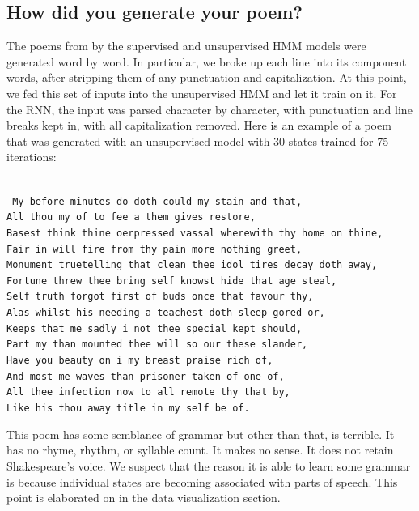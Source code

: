 \subsection{How did you generate your poem?}
The poems from by the supervised and unsupervised HMM models were generated word by word. In particular, we broke up each line into its component words, after stripping them of any punctuation and capitalization. At this point, we fed this set of inputs into the unsupervised HMM and let it train on it. For the RNN, the input was parsed character by character, with punctuation and line breaks kept in, with all capitalization removed. Here is an example of a poem that was generated with an unsupervised model with 30 states trained for 75 iterations: \\ \\
\begin{small}
\texttt{
My before minutes do doth could my stain and that, \\
All thou my of to fee a them gives restore, \\
Basest think thine oerpressed vassal wherewith thy home on thine, \\
Fair in will fire from thy pain more nothing greet, \\
Monument truetelling that clean thee idol tires decay doth away, \\
Fortune threw thee bring self knowst hide that age steal, \\
Self truth forgot first of buds once that favour thy, \\
Alas whilst his needing a teachest doth sleep gored or, \\
Keeps that me sadly i not thee special kept should, \\
Part my than mounted thee will so our these slander, \\
Have you beauty on i my breast praise rich of, \\
And most me waves than prisoner taken of one of, \\
All thee infection now to all remote thy that by, \\
Like his thou away title in my self be of. \\
}
\end{small}
This poem has some semblance of grammar but other than that, is terrible. It has no rhyme, rhythm, or syllable count. It makes no sense. It does not retain Shakespeare's voice. We suspect that the reason it is able to learn some grammar is because individual states are becoming associated with parts of speech. This point is elaborated on in the data visualization section.


